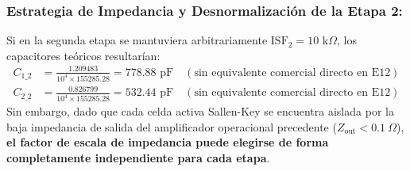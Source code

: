 \documentclass[a4paper,11pt]{article}
\begin{document}
\subsubsection{Estrategia de Impedancia y Desnormalización de la Etapa 2:}
Si en la segunda etapa se mantuviera arbitrariamente $\text{ISF}_2 = 10\text{ k}\Omega$, los capacitores teóricos resultarían:
\begin{align}
C_{1\_2} &= \frac{1.209483}{10^4 \times 155285.28} = 778.88\text{ pF} \quad (\text{sin equivalente comercial directo en E12}) \\
C_{2\_2} &= \frac{0.826799}{10^4 \times 155285.28} = 532.44\text{ pF} \quad (\text{sin equivalente comercial directo en E12})
\end{align}
Sin embargo, dado que cada celda activa Sallen-Key se encuentra aislada por la baja impedancia de salida del amplificador operacional precedente ($Z_{\text{out}} < 0.1\ \Omega$), \textbf{el factor de escala de impedancia puede elegirse de forma completamente independiente para cada etapa}.
\end{document}
